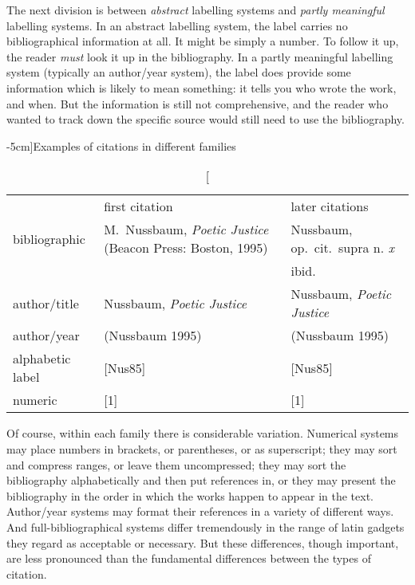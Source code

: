 The next division is between \emph{abstract} labelling systems and
\emph{partly meaningful} labelling systems. In an abstract labelling
system, the label carries no bibliographical information at all.
It might be simply a number. To follow it up, the reader
\emph{must} look it up in the bibliography. In a partly meaningful
labelling system (typically an author/year system), the label does
provide some information which is likely to mean something:
it tells you who wrote the work, and when. But the information is
still not comprehensive, and the reader who wanted to track down the
specific source would still need to use the bibliography.

\begin{table*}[tbh]
\caption[][-5cm]{Examples of citations in different families}
\begin{tabular}{lp{6cm}p{6cm}}
\toprule
& \textsf{first citation} & \textsf{later citations} \\
\cmidrule(lr){2-2}\cmidrule(lr){3-3}
\textsf{bibliographic} & M.\ Nussbaum, \emph{Poetic Justice} (Beacon
Press: Boston, 1995) & Nussbaum, op.\ cit.\ supra n. \emph{x}\\
& & ibid. \\
\textsf{author/title} & Nussbaum, \emph{Poetic Justice} & Nussbaum,
\emph{Poetic Justice}\\
\textsf{author/year} & (Nussbaum 1995) & (Nussbaum 1995) \\
\textsf{alphabetic label} & [Nus85] & [Nus85]\\
\textsf{numeric} & [1] & [1] \\
\bottomrule
\end{tabular}
\end{table*}

Of course, within each family there is considerable
variation. Numerical systems may place numbers in brackets, or parentheses, or
as superscript; they may sort and compress ranges, or leave them
uncompressed; they may sort the bibliography alphabetically and then
put references in, or they may present the bibliography in the order
in which the works happen to appear in the text. Author/year systems may format
their references in a variety of different ways. And
full-bibliographical systems differ tremendously in the range of latin
gadgets they regard as acceptable or necessary. But these differences,
though important, are less pronounced than the fundamental differences
between the types of citation.  

